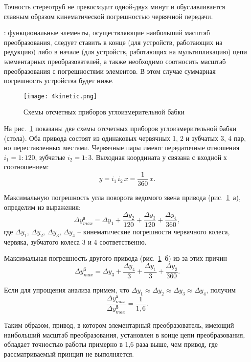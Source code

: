 Точность стереотруб не превосходит одной-двух минут и обуславливается главным образом кинематической погрешностью червячной передачи.

: функциональные элементы, осуществляющие наибольший масштаб преобразования, следует ставить в конце (для устройств, работающих на редукцию) либо в начале (для устройств, работающих на мультипликацию) цепи элементарных преобразователей, а также необходимо соотносить масштаб преобразования с погрешностями элементов. В этом случае суммарная погрешность устройства будет ниже.

\begin{figure}[h!]
	\caption{Схемы отсчетных приборов углоизмерительной бабки}
	\texttt{[image: 4kinetic.png]}
	\label{pic:4kinetic}
\end{figure}

На рис.~\ref{pic:4kinetic} показаны две схемы отсчетных приборов углоизмерительной бабки (стола). Оба привода состоят из одинаковых червячных 1, 2 и зубчатых 3, 4 пар, но переставленных местами. Червячные пары имеют передаточные отношения $ i_1 = 1 : 120 $, зубчатые $ i_2 = 1 : 3 $. Выходная координата у связана с входной х соотношением:
\[
y = i_1 \, i_2 \, x = \dfrac{1}{360}\,x. 
 \]

Максимальную погрешность угла поворота ведомого звена привода (рис.~\ref{pic:4kinetic}~а), определим из выражения:
\[ 
\Delta y_{max}^\text{а} = \Delta y_1 + \dfrac{\Delta y_2}{120}  + \dfrac{\Delta y_3}{120} + \dfrac{\Delta y_4}{360},
\]
где $ \Delta y_1 $, $ \Delta y_2 $, $ \Delta y_3 $, $ \Delta y_4 $ -- кинематические погрешности червячного колеса, червяка, зубчатого колеса 3 и 4 соответственно.

Максимальная погрешность другого привода (рис.~\ref{pic:4kinetic}~б) из-за этих причин
\[ 
\Delta y_{max}^\text{б} = \Delta y_3 + \dfrac{\Delta y_4}{3}  + \dfrac{\Delta y_1}{3} + \dfrac{\Delta y_2}{360}.
\]

Если для упрощения анализа примем, что  $ \Delta y_1 \approx \Delta y_2 \approx \Delta y_3 \approx \Delta y_4 $, получим
\[ 
\dfrac{\Delta y_{max}^\text{а}}{\Delta y_{max}^\text{б}} = \dfrac{1}{1,6}.
\]

Таким образом, привод, в котором элементарный преобразователь, имеющий наибольший масштаб преобразования, установлен в конце цепи преобразования, обладает точностью работы примерно в 1,6 раза выше, чем привод, где рассматриваемый принцип не выполняется.

